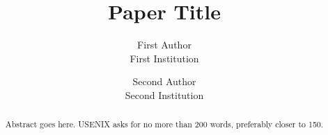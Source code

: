 \documentclass[letterpaper,twocolumn,10pt]{article}
\begin{document}
\newcommand{\OurImplementation}{Aqueduct}

\date{}

\title{\Large \bf Paper Title}

\author{
{\rm First Author}\\
First Institution
\and
{\rm Second Author}\\
Second Institution
} %

\maketitle

\begin{abstract}
Abstract goes here. USENIX asks for no more than 200 words, preferably closer to 150.
\end{abstract}











\end{document}
